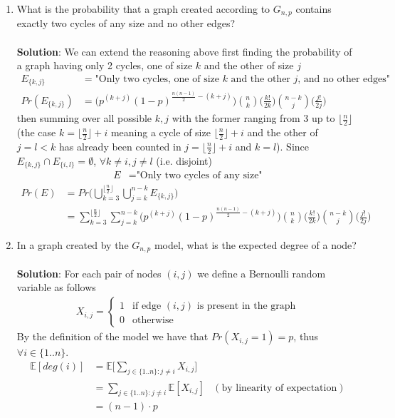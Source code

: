 \documentclass[a4paper]{article}
\begin{document}
\begin{enumerate}
    \item  What is the probability that a graph created according to $G_{n,p}$ contains exactly
    two cycles of any size and no other edges? \\ \\
    \textbf{Solution}: We can extend the reasoning above first finding the probability of a graph having only 2 cycles, one of size $k$ and the other of size $j$
    \begin{align*}
        E_{\{k,j\}} &= \text{"Only two cycles, one of size $k$ and the other $j$,  and no other edges"} \\
        Pr(E_{\{k,j\}}) &= \bigg( p^{(k + j)} (1-p)^{\frac{n(n-1)}{2} - (k + j)} \bigg) \binom{n}{k} \bigg( \frac{k!}{2k} \bigg) \binom{n-k}{j} \bigg( \frac{j!}{2j} \bigg)
    \end{align*}
    then summing over all possible $k,j$ with the former ranging from 3 up to $\lfloor \frac{n}{2} \rfloor$ (the case $k = \lfloor \frac{n}{2} \rfloor + i$ meaning a cycle of size $\lfloor \frac{n}{2} \rfloor + i$ and the other of $j = l < k$ has already been counted in $j = \lfloor \frac{n}{2} \rfloor + i$ and $k = l$). Since $E_{\{k,j\}} \cap E_{\{i, l\}} = \emptyset$, $\forall k \neq i, j \neq l$ (i.e. disjoint)
    \begin{align*}
        E &= \text{"Only two cycles of any size"} 
    \end{align*}
    \begin{align*}
        Pr(E) &= Pr\bigg( \bigcup_{k = 3}^{\lfloor \frac{n}{2} \rfloor} \bigcup_{j = k}^{n - k} E_{\{k,j\}} \bigg) \\
        &= \sum_{k = 3}^{\lfloor \frac{n}{2} \rfloor} \sum_{j = k}^{n - k} \bigg( p^{(k + j)} (1-p)^{\frac{n(n-1)}{2} - (k + j)} \bigg) \binom{n}{k} \bigg( \frac{k!}{2k} \bigg) \binom{n-k}{j} \bigg( \frac{j!}{2j} \bigg)
    \end{align*}

    \item  In a graph created by the $G_{n,p}$ model, what is the expected degree of a node? \\ \\
    \textbf{Solution}: For each pair of nodes $(i,j)$ we define a Bernoulli random variable as follows
    \begin{align*}
    X_{i,j} =
    \begin{cases}
        1 & \text{if edge $(i,j)$ is present in the graph} \\
        0 & \text{otherwise}
    \end{cases}
    \end{align*}
    By the definition of the model we have that $Pr(X_{i,j} = 1) = p$, thus $\forall i \in \{1..n\}$.
    \begin{align*}
        \mathbb{E}[deg(i)] &= \mathbb{E}\Big[ \sum_{j \in \{1..n\}: j \neq i} X_{i,j} \Big] \\
        &= \sum_{j \in \{1..n\}: j \neq i} \mathbb{E}[X_{i,j}] & (\text{by linearity of expectation}) \\
        &= (n - 1) \cdot p
    \end{align*}


\end{enumerate}
\end{document}
